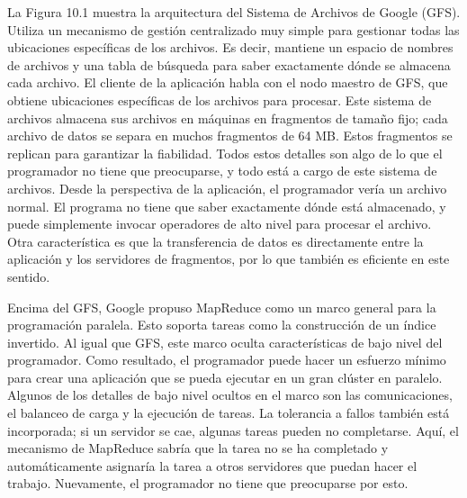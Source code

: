 La Figura 10.1 muestra la arquitectura del Sistema de Archivos de Google (GFS). Utiliza un mecanismo de gestión centralizado muy simple para gestionar todas las ubicaciones específicas de los archivos. Es decir, mantiene un espacio de nombres de archivos y una tabla de búsqueda para saber exactamente dónde se almacena cada archivo. El cliente de la aplicación habla con el nodo maestro de GFS, que obtiene ubicaciones específicas de los archivos para procesar. Este sistema de archivos almacena sus archivos en máquinas en fragmentos de tamaño fijo; cada archivo de datos se separa en muchos fragmentos de 64 MB. Estos fragmentos se replican para garantizar la fiabilidad. Todos estos detalles son algo de lo que el programador no tiene que preocuparse, y todo está a cargo de este sistema de archivos. Desde la perspectiva de la aplicación, el programador vería un archivo normal. El programa no tiene que saber exactamente dónde está almacenado, y puede simplemente invocar operadores de alto nivel para procesar el archivo. Otra característica es que la transferencia de datos es directamente entre la aplicación y los servidores de fragmentos, por lo que también es eficiente en este sentido.

Encima del GFS, Google propuso MapReduce como un marco general para la programación paralela. Esto soporta tareas como la construcción de un índice invertido. Al igual que GFS, este marco oculta características de bajo nivel del programador. Como resultado, el programador puede hacer un esfuerzo mínimo para crear una aplicación que se pueda ejecutar en un gran clúster en paralelo. Algunos de los detalles de bajo nivel ocultos en el marco son las comunicaciones, el balanceo de carga y la ejecución de tareas. La tolerancia a fallos también está incorporada; si un servidor se cae, algunas tareas pueden no completarse. Aquí, el mecanismo de MapReduce sabría que la tarea no se ha completado y automáticamente asignaría la tarea a otros servidores que puedan hacer el trabajo. Nuevamente, el programador no tiene que preocuparse por esto.

